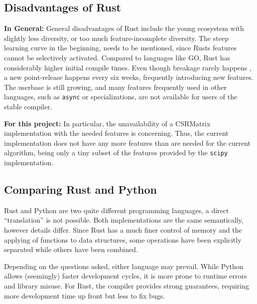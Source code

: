 



\subsection{Disadvantages of Rust}\label{sec:RustDisadvantages}


\textbf{In General:} General disadvantages of Rust include the young ecosystem
with slightly less diversity, or too much feature-incomplete diversity. The
steep learning curve in the beginning, needs to be mentioned, since Rusts
features cannot be selectively activated. Compared to languages like GO, Rust
has considerably higher initial compile times. Even though breakage rarely
happens \cite{rustupdate}, a new point-release happens every six weeks,
frequently introducing new features. The userbase is still growing, and many
features frequently used in other languages, such as \verb|async| or
specializations, are not available for users of the stable compiler.

\textbf{For this project:} In particular, the unavailability of a CSRMatrix
implementation with the needed features is concerning. Thus, the current
implementation does not have any more features than are needed for the current
algorithm, being only a tiny subset of the features provided by the
\verb|scipy| implementation.



\subsection{Comparing Rust and Python}\label{sec:rustvspython}

Rust and Python are two quite different programming languages, a direct
``translation'' is not possible. Both implementations are the same semantically,
however details differ. Since Rust has a much finer control of memory and the
applying of functions to data structures, some operations have been explicitly
separated while others have been combined.

Depending on the questions asked, either language may prevail. While Python
allows (seemingly) faster development cycles, it is more prone to runtime
errors and library misuse. For Rust, the compiler provides strong guarantees,
requiring more development time up front but less to fix bugs.



